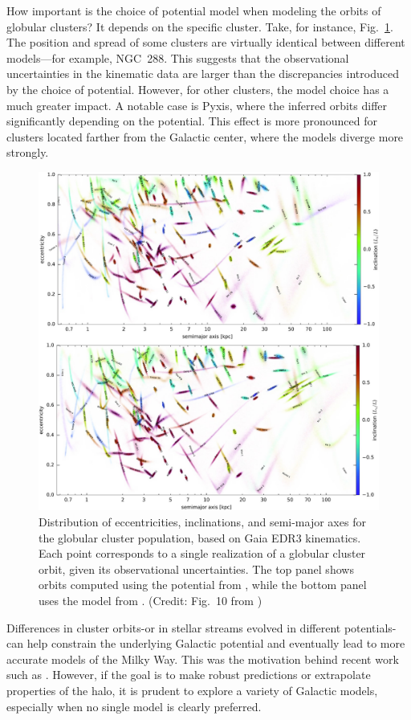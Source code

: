         How important is the choice of potential model when modeling the orbits of globular clusters? It depends on the specific cluster. Take, for instance, Fig.~\ref{fig:vasiliev_2021_EDR3_GCS_FIG_10}. The position and spread of some clusters are virtually identical between different models—for example, NGC~288. This suggests that the observational uncertainties in the kinematic data are larger than the discrepancies introduced by the choice of potential. However, for other clusters, the model choice has a much greater impact. A notable case is Pyxis, where the inferred orbits differ significantly depending on the potential. This effect is more pronounced for clusters located farther from the Galactic center, where the models diverge more strongly.
        \begin{figure}
            \includegraphics[width=\linewidth]{images/vasiliev_2021_EDR3_GCS_FIG_10.jpeg}
            \caption{Distribution of eccentricities, inclinations, and semi-major axes for the globular cluster population, based on Gaia EDR3 kinematics. Each point corresponds to a single realization of a globular cluster orbit, given its observational uncertainties. The top panel shows orbits computed using the potential from \citet{2017MNRAS.465...76M}, while the bottom panel uses the model from \citet{2015ApJS..216...29B}. (Credit: Fig.~10 from \citet{2021MNRAS.505.5978V})}
            \label{fig:vasiliev_2021_EDR3_GCS_FIG_10}
        \end{figure}
        Differences in cluster orbits-or in stellar streams evolved in different potentials-can help constrain the underlying Galactic potential and eventually lead to more accurate models of the Milky Way. This was the motivation behind recent work such as \citet{2024ApJ...967...89I}. However, if the goal is to make robust predictions or extrapolate properties of the halo, it is prudent to explore a variety of Galactic models, especially when no single model is clearly preferred.
    
